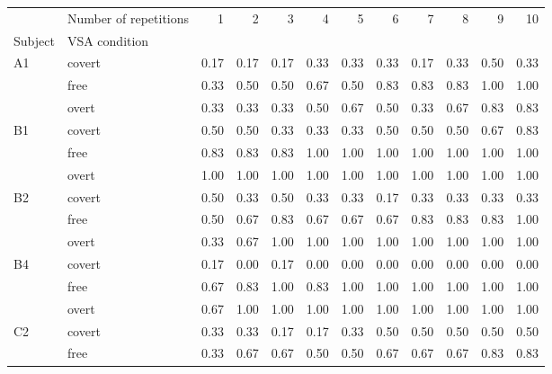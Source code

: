 \begin{tabular}{llrrrrrrrrrr}
	\toprule
	                       & Number of repetitions & 1    & 2    & 3    & 4    & 5    & 6    & 7    & 8    & 9    & 10   \\
	Subject                & VSA condition         &      &      &      &      &      &      &      &      &      &      \\
	\midrule
	\multirow[t]{3}{*}{A1} & covert                & 0.17 & 0.17 & 0.17 & 0.33 & 0.33 & 0.33 & 0.17 & 0.33 & 0.50 & 0.33 \\
	                       & free                  & 0.33 & 0.50 & 0.50 & 0.67 & 0.50 & 0.83 & 0.83 & 0.83 & 1.00 & 1.00 \\
	                       & overt                 & 0.33 & 0.33 & 0.33 & 0.50 & 0.67 & 0.50 & 0.33 & 0.67 & 0.83 & 0.83 \\
	\cline{1-12}
	\multirow[t]{3}{*}{B1} & covert                & 0.50 & 0.50 & 0.33 & 0.33 & 0.33 & 0.50 & 0.50 & 0.50 & 0.67 & 0.83 \\
	                       & free                  & 0.83 & 0.83 & 0.83 & 1.00 & 1.00 & 1.00 & 1.00 & 1.00 & 1.00 & 1.00 \\
	                       & overt                 & 1.00 & 1.00 & 1.00 & 1.00 & 1.00 & 1.00 & 1.00 & 1.00 & 1.00 & 1.00 \\
	\cline{1-12}
	\multirow[t]{3}{*}{B2} & covert                & 0.50 & 0.33 & 0.50 & 0.33 & 0.33 & 0.17 & 0.33 & 0.33 & 0.33 & 0.33 \\
	                       & free                  & 0.50 & 0.67 & 0.83 & 0.67 & 0.67 & 0.67 & 0.83 & 0.83 & 0.83 & 1.00 \\
	                       & overt                 & 0.33 & 0.67 & 1.00 & 1.00 & 1.00 & 1.00 & 1.00 & 1.00 & 1.00 & 1.00 \\
	\cline{1-12}
	\multirow[t]{3}{*}{B4} & covert                & 0.17 & 0.00 & 0.17 & 0.00 & 0.00 & 0.00 & 0.00 & 0.00 & 0.00 & 0.00 \\
	                       & free                  & 0.67 & 0.83 & 1.00 & 0.83 & 1.00 & 1.00 & 1.00 & 1.00 & 1.00 & 1.00 \\
	                       & overt                 & 0.67 & 1.00 & 1.00 & 1.00 & 1.00 & 1.00 & 1.00 & 1.00 & 1.00 & 1.00 \\
	\cline{1-12}
	\multirow[t]{3}{*}{C2} & covert                & 0.33 & 0.33 & 0.17 & 0.17 & 0.33 & 0.50 & 0.50 & 0.50 & 0.50 & 0.50 \\
	                       & free                  & 0.33 & 0.67 & 0.67 & 0.50 & 0.50 & 0.67 & 0.67 & 0.67 & 0.83 & 0.83 \\

\end{tabular}
